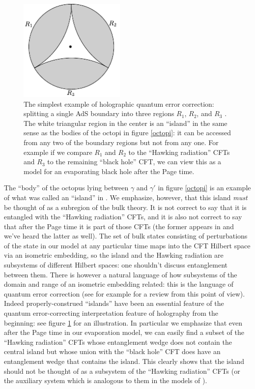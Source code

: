 \documentclass[12pt]{article}
\newcommand{\bfig}{\begin{figure}\begin{center}}
\newcommand{\efig}{\end{center}\end{figure}}
\theoremstyle{definition}
\begin{document}
\bfig
\includegraphics[height=5cm]{triple2.pdf}
\caption{The simplest example of holographic quantum error correction: splitting a single AdS boundary into three regions $R_1$, $R_2$, and $R_3$ \cite{Almheiri:2014lwa}.  The white triangular region in the center is an ``island'' in the same sense as the bodies of the octopi in figure \ref{octopi}: it can be accessed from any two of the boundary regions but not from any one.  For example if we compare $R_1$ and $R_2$ to the ``Hawking radiation'' CFTs and $R_3$ to the remaining ``black hole'' CFT, we can view this as a model for an evaporating black hole after the Page time.}\label{qec}
\efig
The ``body'' of the octopus lying between $\gamma$ and $\gamma'$ in figure \ref{octopi} is an example of what was called an ``island'' in \cite{Almheiri:2019hni}.  We emphasize, however, that this island \textit{must} be thought of as a subregion of the bulk theory.  It is not correct to say that it is entangled with the ``Hawking radiation'' CFTs, and it is also not correct to say that after the Page time it is part of those CFTs (the former appears in \cite{Almheiri:2019hni} and we've heard the latter as well).  The set of bulk states consisting of perturbations of the state in our model at any particular time maps into the CFT Hilbert space via an isometric embedding, so the island and the Hawking radiation are subsystems of different Hilbert spaces: one shouldn't discuss entanglement between them.  There is however a natural language of how subsystems of the domain and range of an isometric embedding related: this is the language of quantum error correction (see for example \cite{Harlow:2016vwg} for a review from this point of view).  Indeed properly-construed ``islands''  have been an essential feature of the quantum error-correcting interpretation feature of holography from the beginning: see figure \ref{qec} for an illustration.  In particular we emphasize that even after the Page time in our evaporation model, we can easily find a subset of the ``Hawking radiation'' CFTs whose entanglement wedge does not contain the central island but whose union with the ``black hole'' CFT does have an entanglement wedge that contains the island.  This clearly shows that the island should not be thought of as a subsystem of the ``Hawking radiation'' CFTs (or the auxiliary system which is analogous to them in the models of \cite{Almheiri:2019psf,Penington:2019npb,Almheiri:2019hni}). 
\end{document}
